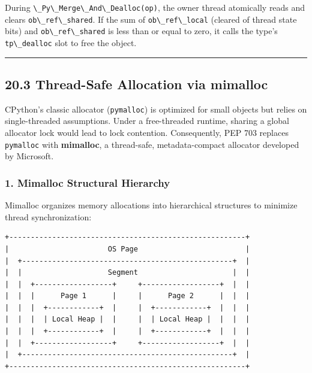 During \passthrough{\lstinline!\_Py\_Merge\_And\_Dealloc(op)!}, the
owner thread atomically reads and clears
\passthrough{\lstinline!ob\_ref\_shared!}. If the sum of
\passthrough{\lstinline!ob\_ref\_local!} (cleared of thread state bits)
and \passthrough{\lstinline!ob\_ref\_shared!} is less than or equal to
zero, it calls the type's \passthrough{\lstinline!tp\_dealloc!} slot to
free the object.

\begin{center}\rule{0.5\linewidth}{0.5pt}\end{center}

\hypertarget{thread-safe-allocation-via-mimalloc}{%
\subsection{20.3 Thread-Safe Allocation via
mimalloc}\label{thread-safe-allocation-via-mimalloc}}

CPython's classic allocator (\passthrough{\lstinline!pymalloc!}) is
optimized for small objects but relies on single-threaded assumptions.
Under a free-threaded runtime, sharing a global allocator lock would
lead to lock contention. Consequently, PEP 703 replaces
\passthrough{\lstinline!pymalloc!} with \textbf{mimalloc}, a
thread-safe, metadata-compact allocator developed by Microsoft.

\hypertarget{mimalloc-structural-hierarchy}{%
\subsubsection{1. Mimalloc Structural
Hierarchy}\label{mimalloc-structural-hierarchy}}

Mimalloc organizes memory allocations into hierarchical structures to
minimize thread synchronization:

\begin{lstlisting}
+-------------------------------------------------------+
|                       OS Page                         |
|  +-------------------------------------------------+  |
|  |                    Segment                      |  |
|  |  +------------------+     +------------------+  |  |
|  |  |      Page 1      |     |      Page 2      |  |  |
|  |  |  +------------+  |     |  +------------+  |  |  |
|  |  |  | Local Heap |  |     |  | Local Heap |  |  |  |
|  |  |  +------------+  |     |  +------------+  |  |  |
|  |  +------------------+     +------------------+  |  |
|  +-------------------------------------------------+  |
+-------------------------------------------------------+
\end{lstlisting}

